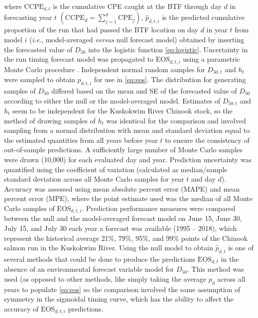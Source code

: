 \documentclass[12pt,]{book}
\theoremstyle{definition}
\theoremstyle{definition}
\theoremstyle{definition}
\theoremstyle{remark}
\begin{document}
\noindent
where \(\text{CCPE}_{d,t}\) is the cumulative CPE caught at the BTF
through day \(d\) in forecasting year \(t\)
\(\left(\text{CCPE}_d = \sum_{j=1}^{d} \text{CPE}_j \right)\),
\(\hat{p}_{d,t,i}\) is the predicted cumulative proportion of the run
that had passed the BTF location on day \(d\) in year \(t\) from model
\(i\) (\emph{i}.\emph{e}., model-averaged \emph{versus} null forecast
model) obtained by inserting the forecasted value of \(D_{50}\) into the
logistic function \eqref{eq:logistic}. Uncertainty in the run timing
forecast model was propagated to \(\text{EOS}_{d,t,i}\) using a
parametric Monte Carlo procedure \citep{bolker-2008}. Independent normal
random samples for \(D_{50,t}\) and \(h_t\) were sampled to obtain
\(p_{d,t,i}\) for use in \eqref{eq:eos}. The distribution for generating
samples of \(D_{50}\) differed based on the mean and SE of the
forecasted value of \(D_{50}\) according to either the null or the
model-averaged model. Estimates of \(D_{50,t}\) and \(h_t\) seem to be
independent for the Kuskokwim River Chinook stock, so the method of
drawing samples of \(h_t\) was identical for the comparison and involved
sampling from a normal distribution with mean and standard deviation
equal to the estimated quantities from all years before year \(t\) to
ensure the consistency of out-of-sample predictions. A sufficiently
large number of Monte Carlo samples were drawn (10,000) for each
evaluated day and year. Prediction uncertainty was quantified using the
coefficient of variation (calculated as median/sample standard deviation
across all Monte Carlo samples for year \(t\) and day \(d\)). Accuracy
was assessed using mean absolute percent error (MAPE) and mean percent
error (MPE), where the point estimate used was the median of all Monte
Carlo samples of \(\text{EOS}_{d,t,i}\). Prediction performance measures
were compared between the null and the model-averaged forecast model on
June 15, June 30, July 15, and July 30 each year a forecast was
available (1995 -- 2018), which represent the historical average 21\%,
79\%, 95\%, and 99\% points of the Chinook salmon run in the Kuskokwim
River. Using the null model to obtain \(\hat{p}_{d,t}\) is one of
several methods that could be done to produce the predictions
\(\text{EOS}_{d,t}\) in the absence of an environmental forecast
variable model for \(D_{50}\). This method was used (as opposed to other
methods, like simply taking the average \(p_d\) across all years to
populate \eqref{eq:eos} so the comparison involved the same assumption of
symmetry in the sigmoidal timing curve, which has the ability to affect
the accuracy of \(\text{EOS}_{d,t,i}\) predictions.
\end{document}
